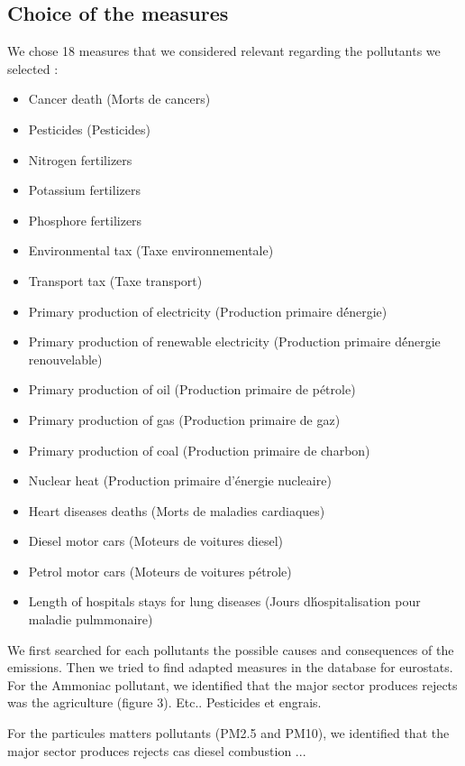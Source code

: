 \documentclass[preprint,journal]{vgtc}       %
\begin{document}
	\subsection{Choice of the measures}
	We chose 18 measures that we considered relevant regarding the pollutants we selected : 
		\begin{itemize}
		\item Cancer death (Morts de cancers)
		\item Pesticides (Pesticides)
		\item Nitrogen fertilizers
		\item Potassium fertilizers
		\item Phosphore fertilizers
		\item Environmental tax (Taxe environnementale)
		\item Transport tax (Taxe transport)
		\item Primary production of electricity (Production primaire d\'énergie)
		\item Primary production of renewable electricity (Production primaire d\'énergie renouvelable)
		\item Primary production of oil (Production primaire de pétrole)
		\item Primary production of gas (Production primaire de gaz)
		\item Primary production of coal (Production primaire de charbon)
		\item Nuclear heat (Production primaire d'énergie nucleaire)
		\item Heart diseases deaths (Morts de maladies cardiaques)
		\item Diesel motor cars (Moteurs de voitures diesel)
		\item Petrol motor cars (Moteurs de voitures pétrole)
		\item Length of hospitals stays for lung diseases (Jours d\'hospitalisation pour maladie pulmmonaire)
		\end{itemize}
		
		We first searched for each pollutants the possible causes and consequences of the emissions. Then we tried to find adapted measures in the database for eurostats.
		For the Ammoniac pollutant, we identified that the major sector produces rejects was the agriculture (figure 3).
		Etc.. Pesticides et engrais.
		
		For the particules matters pollutants (PM2.5 and PM10), we identified that the major sector produces rejects cas diesel combustion ...
		
\end{document}
